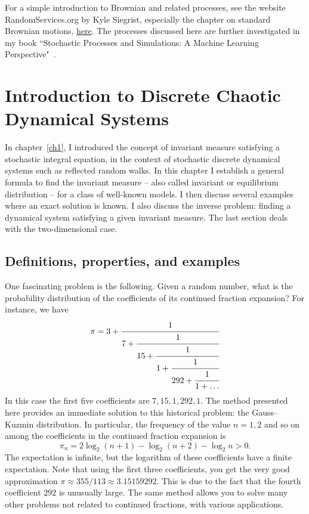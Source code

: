 \documentclass[oneside,10pt]{book}
\begin{document}
For a simple introduction to Brownian and related processes, see the website RandomServices.org by Kyle Siegrist, especially the chapter on
standard Brownian motions, \href{https://www.randomservices.org/random/brown/Standard.html}{here}. The processes discussed here are further investigated in my book ``Stochastic Processes and Simulations: A Machine Learning Perspective"~\cite{vgsimulnew}.


\chapter{Introduction to Discrete Chaotic Dynamical Systems}


In chapter~\ref{ch1}, I introduced the concept of invariant measure satisfying a stochastic integral equation, in the context of stochastic
 discrete dynamical systems such as reflected random walks. In this chapter I establish a general formula to find the invariant measure -- also called invariant or equilibrium distribution -- for a class of well-known models. I then discuss several examples where 
 an exact solution is known. I also discuss the inverse problem:  finding a dynamical system satisfying a given invariant measure. The last section deals with the two-dimensional case.

\section{Definitions, properties, and examples}\label{oifvcd}

One fascinating problem is the following.  Given a random number, what is the probability distribution of the coefficients of its continued fraction expansion? For instance, we have 
$$
\pi = 3 + \cfrac{1}{7 + \cfrac{1}{15 +\cfrac{1}{1 +\cfrac{1}{292 +\cfrac{1}{1 + \dots}}}}}
$$
In this case the first five coefficients are 
 $7, 15, 1, 292, 1$. The method presented here provides an immediate solution to this historical problem: the Gauss–Kuzmin distribution. In particular, the frequency of the value $n=1,2$ and so on among the coefficients in the continued fraction expansion is 
\begin{equation}
\pi_n = 2\log_2 (n+1) - \log_2 (n+2) - \log_2 n > 0.\label{tatar}
\end{equation}
The expectation is infinite, but the logarithm of these coefficients have a finite expectation. Note that using the first three coefficients, you get the very good approximation $\pi \approx 355/113  \approx 3.15159292$. This is due to the fact that the fourth coefficient $292$ is unusually large. The same method allows you to solve many other problems not related to continued fractions, with various applications.
 
\end{document}
